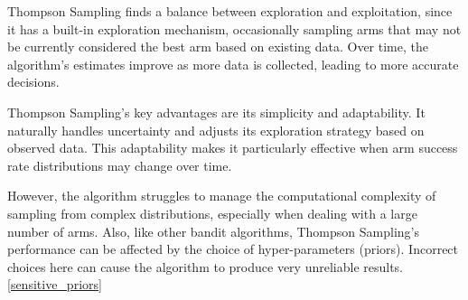 Thompson Sampling finds a balance between exploration and exploitation, since it has a built-in exploration mechanism, occasionally sampling arms that may not be currently considered the best arm based on existing data. Over time, the algorithm's estimates improve as more data is collected, leading to more accurate decisions.

Thompson Sampling's key advantages are its simplicity and adaptability. It naturally handles uncertainty and adjusts its exploration strategy based on observed data. This adaptability makes it particularly effective when arm success rate distributions may change over time.

However, the algorithm struggles to manage the computational complexity of sampling from complex distributions, especially when dealing with a large number of arms. Also, like other bandit algorithms, Thompson Sampling's performance can be affected by the choice of hyper-parameters (priors). Incorrect choices here can cause the algorithm to produce very unreliable results.\ref{sensitive_priors}
